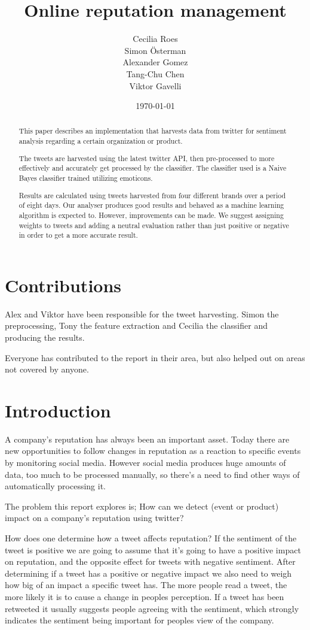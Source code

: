 \documentclass[a4paper]{article}
\title{Online reputation management}
\date{\today}
\author{Cecilia Roes \\ Simon Österman \\ Alexander Gomez \\ Tang-Chu Chen \\ Viktor Gavelli}
\begin{document}
\maketitle
\begin{abstract}
This paper describes an implementation that harvests data from twitter for sentiment analysis regarding a certain organization or product.

The tweets are harvested using the latest twitter API, then pre-processed to more effectively and accurately get processed by the classifier. The classifier used is a Naive Bayes classifier trained utilizing emoticons.  

Results are calculated using tweets harvested from four different brands over a period of eight days. Our analyser produces good results and behaved as a machine learning algorithm is expected to. However, improvements can be made. We suggest assigning weights to tweets and adding a neutral evaluation rather than just positive or negative in order to get a more accurate result.

\end{abstract}
\newpage
\tableofcontents
\section*{Contributions}
Alex and Viktor have been responsible for the tweet harvesting.
Simon the preprocessing, Tony the feature extraction and Cecilia the classifier and producing the results.

Everyone has contributed to the report in their area, but also helped out on areas not covered by anyone.
\newpage
\section{Introduction}
A company’s reputation has always been an important asset. Today there are new opportunities to follow changes in reputation as a reaction to specific events by monitoring social media. However social media produces huge amounts of data, too much to be processed manually, so there’s a need to find other ways of automatically processing it.

The problem this report explores is; How can we detect (event or product) impact on a company’s reputation using twitter?

How does one determine how a tweet affects reputation? If the sentiment of the tweet is positive we are going to assume that it’s going to have a positive impact on reputation, and the opposite effect for tweets with negative sentiment. After determining if a tweet has a positive or negative impact we also need to weigh how big of an impact a specific tweet has. The more people read a tweet, the more likely it is to cause a change in peoples perception. If a tweet has been retweeted it usually suggests people agreeing with the sentiment, which strongly indicates the sentiment being important for peoples view of the company.
\end{document}
